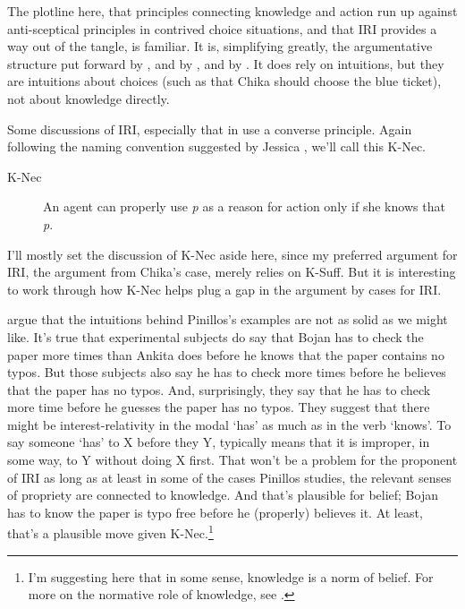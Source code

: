 The plotline here, that principles connecting knowledge and action run up against anti-sceptical principles in contrived choice situations, and that IRI provides a way out of the tangle, is familiar. It is, simplifying greatly, the argumentative structure put forward by  \citet{Hawthorne2004}, and by  \citet{FantlMcGrath2002, FantlMcGrath2009}, and by  \citet{Weatherson2012}. It does rely on intuitions, but they are intuitions about choices (such as that Chika should choose the blue ticket), not about knowledge directly.

Some discussions of IRI, especially that in  \citet{HawthorneStanley2008} use a converse principle. Again following the naming convention suggested by Jessica  \citet{Brown2013}, we'll call this K-Nec.

\begin{description}

\item[K-Nec]

An agent can properly use \emph{p} as a reason for action only if she knows that \emph{p}.
\end{description}
I'll mostly set the discussion of K-Nec aside here, since my preferred argument for IRI, the argument from Chika's case, merely relies on K-Suff. But it is interesting to work through how K-Nec helps plug a gap in the argument by cases for IRI.

 \citet{BuckwalterSchaffer2015} argue that the intuitions behind Pinillos's examples are not as solid as we might like. It's true that experimental subjects do say that Bojan has to check the paper more times than Ankita does before he knows that the paper contains no typos. But those subjects also say he has to check more times before he believes that the paper has no typos. And, surprisingly, they say that he has to check more time before he guesses the paper has no typos. They suggest that there might be interest-relativity in the modal `has' as much as in the verb `knows'. To say someone `has' to X before they Y, typically means that it is improper, in some way, to Y without doing X first. That won't be a problem for the proponent of IRI as long as at least in some of the cases Pinillos studies, the relevant senses of propriety are connected to knowledge. And that's plausible for belief; Bojan has to know the paper is typo free before he (properly) believes it. At least, that's a plausible move given K-Nec.\footnote{I'm suggesting here that in some sense, knowledge is a norm of belief. For more on the normative role of knowledge, see  \citet{Worsnip2016}.}

